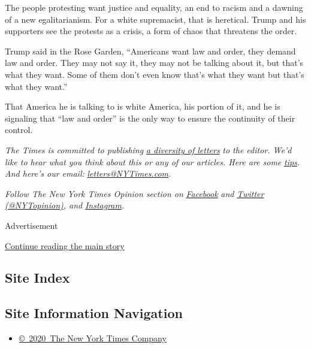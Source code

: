 The people protesting want justice and equality, an end to racism and a
dawning of a new egalitarianism. For a white supremacist, that is
heretical. Trump and his supporters see the protests as a crisis, a form
of chaos that threatens the order.

Trump said in the Rose Garden, ``Americans want law and order, they
demand law and order. They may not say it, they may not be talking about
it, but that's what they want. Some of them don't even know that's what
they want but that's what they want.''

That America he is talking to is white America, his portion of it, and
he is signaling that ``law and order'' is the only way to ensure the
continuity of their control.

\emph{The Times is committed to publishing}
\href{https://www.nytimes3xbfgragh.onion/2019/01/31/opinion/letters/letters-to-editor-new-york-times-women.html}{\emph{a
diversity of letters}} \emph{to the editor. We'd like to hear what you
think about this or any of our articles. Here are some}
\href{https://help.nytimes3xbfgragh.onion/hc/en-us/articles/115014925288-How-to-submit-a-letter-to-the-editor}{\emph{tips}}\emph{.
And here's our email:}
\href{mailto:letters@NYTimes.com}{\emph{letters@NYTimes.com}}\emph{.}

\emph{Follow The New York Times Opinion section on}
\href{https://www.facebookcorewwwi.onion/nytopinion}{\emph{Facebook}}
\emph{and} \href{http://twitter.com/NYTOpinion}{\emph{Twitter
(@NYTopinion)}}\emph{, and}
\href{https://www.instagram.com/nytopinion/}{\emph{Instagram}}\emph{.}

Advertisement

\protect\hyperlink{after-bottom}{Continue reading the main story}

\hypertarget{site-index}{%
\subsection{Site Index}\label{site-index}}

\hypertarget{site-information-navigation}{%
\subsection{Site Information
Navigation}\label{site-information-navigation}}

\begin{itemize}
\tightlist
\item
  \href{https://help.nytimes3xbfgragh.onion/hc/en-us/articles/115014792127-Copyright-notice}{©~2020~The
  New York Times Company}
\end{itemize}

